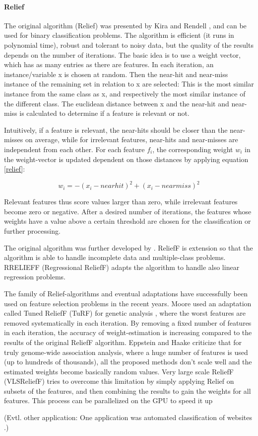 \paragraph{Relief}
\label{par:methods.flat.filter.relief}

The original algorithm (Relief) was presented by Kira and Rendell \cite{Kira:92}, and can be used for binary classification problems. The algorithm is efficient (it runs in polynomial time), robust and tolerant to noisy data, but the quality of the results depends on the number of iterations.
The basic idea is to use a weight vector, which has as many entries as there are features. In each iteration, an instance/variable x is chosen at random. Then the near-hit and near-miss instance of the remaining set in relation to x are selected: This is the most similar instance from the same class as x, and respectively the most similar instance of the different class. The euclidean distance between x and the near-hit and near-miss is calculated to determine if a feature is relevant or not.  

Intuitively, if a feature is relevant, the near-hits should be closer than the near-misses on average, while for irrelevant features, near-hits and near-misses are independent from each other. 
For each feature $f_i$, the corresponding weight $w_i$ in the weight-vector is updated dependent on those distances by applying equation \ref{relief}:

\begin{equation}
\label{relief}
w_i = - (x_i - nearhit)^2  + (x_i - nearmiss)^2
\end{equation}

Relevant features thus score values larger than zero, while irrelevant features become zero or negative. After a desired number of iterations, the features whose weights have a value above a certain threshold are chosen for the classification or further processing.

The original algorithm was further developed by \cite{Kononenko:97}. ReliefF  is extension so that the algorithm is able to handle incomplete data and multiple-class problems. 
RRELIEFF (Regressional ReliefF) \cite{Robnik-Sikonja:97} adapts the algorithm to handle also linear regression problems.

The family of Relief-algorithms and eventual adaptations have successfully been used on feature selection problems in the recent years. Moore used an adaptation called Tuned ReliefF (TuRF) for genetic analysis \cite{Moore:07}, where the worst features are removed systematically in each iteration. By removing a fixed number of features in each iteration, the accuracy of weight-estimation is increasing compared to the results of the original ReliefF algorithm. Eppstein and Haake \cite{Eppstein:08} criticize that for truly genome-wide association analysis, where a huge number of features is used (up to hundreds of thousands), all the proposed methods don't scale well and the estimated weights become basically random values. Very large scale ReliefF (VLSReliefF) tries to overcome this limitation by simply applying Relief on subsets of the features, and then combining the results to gain the weights for all features. This process can be parallelized on the GPU to speed it up \cite{Lee:15}

(Evtl. other application: One application was automated classification of websites \cite{Jin:07}.)

